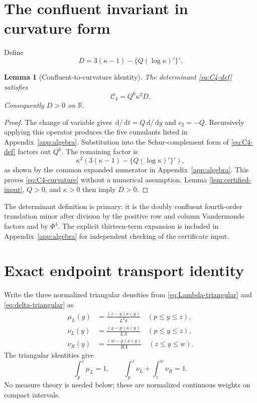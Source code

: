 \documentclass[11pt]{article}
\newtheorem{lemma}[theorem]{Lemma}
\theoremstyle{remark}
\newcommand{\R}{\mathbb{R}}
\newcommand{\Cfour}{\mathcal{C}_4}
\newcommand{\dd}{\,\mathrm{d}}
\newcommand{\appref}[1]{Appendix~\ref{#1}}
\numberwithin{equation}{section}
\begin{document}
\section{The confluent invariant in curvature form}\label{sec:confluent}

Define
\begin{equation}\label{eq:D-def}
 D=3(\kappa-1)-\{Q(\log\kappa)'\}'.
\end{equation}

\begin{lemma}[Confluent-to-curvature identity]\label{lem:C4-curvature}
The determinant \eqref{eq:C4-def} satisfies
\begin{equation}\label{eq:C4-curvature}
 \Cfour=Q^6\kappa^2D.
\end{equation}
Consequently \(D>0\) on \(\R\).
\end{lemma}

\begin{proof}
The change of variable gives \(\dd/\dd t=Q\dd/\dd y\) and \(c_2=-Q\).
Recursively applying this operator produces the five cumulants listed in
\appref{app:algebra}. Substitution into the Schur-complement form of
\eqref{eq:C4-def} factors out \(Q^6\). The remaining factor is
\[
 \kappa^2\left(3(\kappa-1)-\{Q(\log\kappa)'\}'\right),
\]
as shown by the common expanded numerator in \appref{app:algebra}. This proves
\eqref{eq:C4-curvature} without a numerical assumption. Lemma
\ref{lem:certified-input}, \(Q>0\), and \(\kappa>0\) then imply \(D>0\).
\end{proof}

The determinant definition is primary: it is the doubly confluent
fourth-order translation minor after division by the positive row and column
Vandermonde factors and by \(\Phi^4\). The explicit thirteen-term expansion is
included in \appref{app:algebra} for independent checking of the certificate
input.

\section{Exact endpoint transport identity}\label{sec:transport}

Write the three normalized triangular densities from
\eqref{eq:Lambda-triangular} and \eqref{eq:delta-triangular} as
\begin{align}
 \mu_L(y)&=\frac{(z-y)\kappa(y)}{L^2\delta}
 \quad(p\leq y\leq z),\label{eq:mu}\\
 \nu_L(y)&=\frac{(y-p)\kappa(y)}{L\Lambda}
 \quad(p\leq y\leq z),\nonumber\\
 \nu_R(y)&=\frac{(w-y)\kappa(y)}{R\Lambda}
 \quad(z\leq y\leq w).\label{eq:nu}
\end{align}
The triangular identities give
\begin{equation}\label{eq:density-masses}
 \int_p^z\mu_L=1,\qquad
 \int_p^z\nu_L+\int_z^w\nu_R=1.
\end{equation}
No measure theory is needed below; these are normalized continuous weights on
compact intervals.
\end{document}
